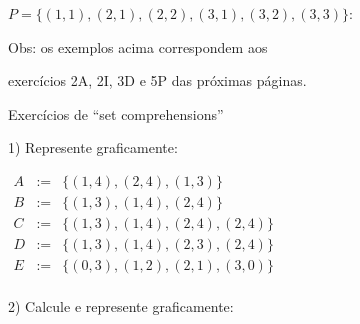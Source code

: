 \documentclass[oneside]{book}
\begin{document}
$P = \{(1,1), (2,1), (2,2), (3,1), (3,2), (3,3)\}$:


\bsk

Obs: os exemplos acima correspondem aos

exercícios 2A, 2I, 3D e 5P das próximas páginas.




\newpage

%
 {Exercícios de ``set comprehensions''}

1) Represente graficamente:

$\begin{array}{rcl}
 A & := & \{(1,4), (2,4), (1,3)\} \\
 B & := & \{(1,3), (1,4), (2,4)\} \\
 C & := & \{(1,3), (1,4), (2,4), (2,4)\} \\
 D & := & \{(1,3), (1,4), (2,3), (2,4)\} \\
 E & := & \{(0,3), (1,2), (2,1), (3,0)\} \\
\end{array}
$

\msk

2) Calcule e represente graficamente:
\end{document}
